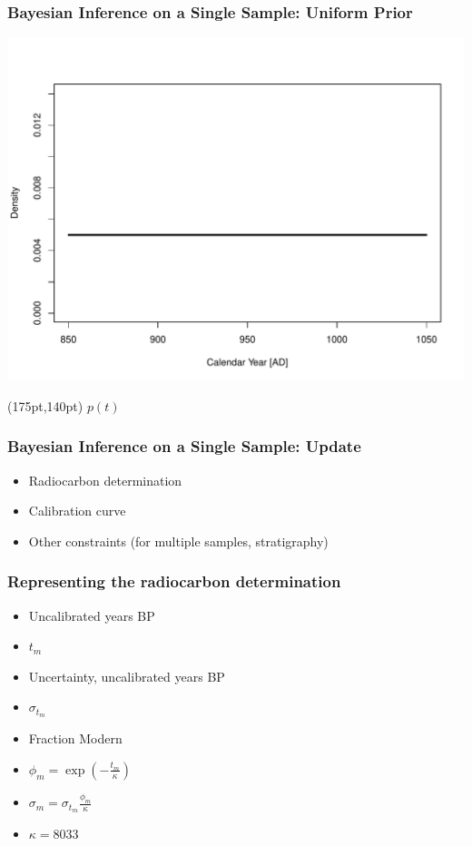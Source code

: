 \documentclass{beamer}
\begin{document}
\begin{frame}[t]
  \frametitle{Bayesian Inference on a Single Sample: Uniform Prior}
    \begin{center}
      \includegraphics[height=.8\textheight]{single_obs_inf_plot1.pdf}
    \end{center}
    \begin{textblock*}{100pt}(175pt,140pt)
      \Large $p(t)$ \normalsize
	\end{textblock*}
\end{frame}

\begin{frame}[t]
  \frametitle{Bayesian Inference on a Single Sample: Update}
    \begin{itemize}
    \item Radiocarbon determination
    \pause
    \item Calibration curve
    \pause
    \item Other constraints (for multiple samples, stratigraphy)
    \end{itemize}
\end{frame}

\begin{frame}[t]
  \frametitle{Representing the radiocarbon determination}
    \begin{itemize}
    \item Uncalibrated years BP
    \item $t_{m}$
    \pause
    \item Uncertainty, uncalibrated years BP
    \item $\sigma_{t_m}$
    \pause
    \item Fraction Modern
    \item $\phi_m = \exp(-\frac{t_m}{\kappa})$
    \item $\sigma_m = \sigma_{t_m} \frac{\phi_m}{\kappa}$
    \item $\kappa=8033$
    \end{itemize}
 
\end{frame}
\end{document}
